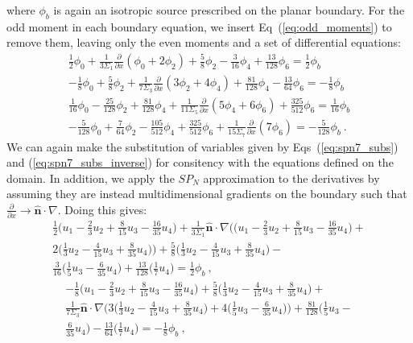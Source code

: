 where $\phi_b$ is again an isotropic source prescribed on the planar
boundary. For the odd moment in each boundary equation, we insert
Eq~(\ref{eq:odd_moments}) to remove them, leaving only the even
moments and a set of differential equations:
\begin{subequations}
  \begin{gather}
    \frac{1}{2}\phi_0 + \frac{1}{3\Sigma_1}\frac{\partial}{\partial
      x}(\phi_0+2\phi_2) + \frac{5}{8}\phi_2 - \frac{3}{16}\phi_4 +
    \frac{13}{128}\phi_6 = \frac{1}{2}\phi_{b}\\ -\frac{1}{8}\phi_0 +
    \frac{5}{8}\phi_2 + \frac{1}{7\Sigma_3}\frac{\partial}{\partial
      x}(3\phi_2 + 4\phi_4) + \frac{81}{128}\phi_4 -
    \frac{13}{64}\phi_6 = -\frac{1}{8}\phi_{b}\\ \frac{1}{16}\phi_0 -
    \frac{25}{128}\phi_2 + \frac{81}{128}\phi_4 +
    \frac{1}{11\Sigma_5}\frac{\partial}{\partial x}(5\phi_4 + 6\phi_6)
    + \frac{325}{512}\phi_6 =
    \frac{1}{16}\phi_{b}\\ -\frac{5}{128}\phi_0 + \frac{7}{64}\phi_2 -
    \frac{105}{512}\phi_4 + \frac{325}{512}\phi_6 +
    \frac{1}{15\Sigma_7}\frac{\partial}{\partial x}(7\phi_6)
    = -\frac{5}{128}\phi_{b}\:.
  \end{gather}
  \label{eq:spn_bnd_subs}
\end{subequations}
We can again make the substitution of variables given by
Eqs~(\ref{eq:spn7_subs}) and (\ref{eq:spn7_subs_inverse}) for
consitency with the equations defined on the domain. In addition, we
apply the $SP_N$ approximation to the derivatives by assuming they are
instead multidimensional gradients on the boundary such that
$\frac{\partial}{\partial x} \rightarrow
\hat{\mathbf{n}}\cdot\nabla$. Doing this gives:
\begin{multline}
    \frac{1}{2}\Big(u_1 - \frac{2}{3}u_2 + \frac{8}{15}u_3 -
    \frac{16}{35}u_4\Big) +
    \frac{1}{3\Sigma_1}\hat{\mathbf{n}}\cdot\nabla\Big(\Big(u_1 -
    \frac{2}{3}u_2 + \frac{8}{15}u_3 -
    \frac{16}{35}u_4\Big)+\\2\Big(\frac{1}{3}u_2 - \frac{4}{15}u_3 +
    \frac{8}{35}u_4\Big)\Big) + \frac{5}{8}\Big(\frac{1}{3}u_2 -
    \frac{4}{15}u_3 + \frac{8}{35}u_4\Big)
    -\\ \frac{3}{16}\Big(\frac{1}{5}u_3 - \frac{6}{35}u_4\Big) +
    \frac{13}{128}\Big(\frac{1}{7}u_4\Big) = \frac{1}{2}\phi_{b}\:,
\end{multline}
\begin{multline}
    -\frac{1}{8}\Big(u_1 - \frac{2}{3}u_2 + \frac{8}{15}u_3 -
    \frac{16}{35}u_4\Big) + \frac{5}{8}\Big(\frac{1}{3}u_2 -
    \frac{4}{15}u_3 + \frac{8}{35}u_4\Big)
    +\\ \frac{1}{7\Sigma_3}\hat{\mathbf{n}}\cdot\nabla\Big
    (3\Big(\frac{1}{3}u_2 - \frac{4}{15}u_3 + \frac{8}{35}u_4\Big) +
    4\Big(\frac{1}{5}u_3 - \frac{6}{35}u_4\Big)\Big) +
    \frac{81}{128}\Big(\frac{1}{5}u_3 -\\ \frac{6}{35}u_4\Big) -
    \frac{13}{64}\Big(\frac{1}{7}u_4\Big) = -\frac{1}{8}\phi_{b}\:,
\end{multline}
